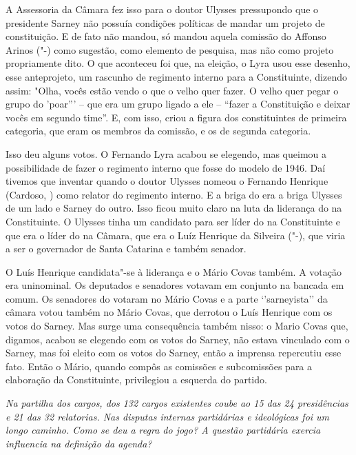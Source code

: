 A Assessoria da Câmara fez isso para o doutor Ulysses pressupondo que o
presidente Sarney não possuía condições políticas de mandar um projeto
de constituição. E de fato não mandou, só mandou aquela comissão do
Affonso Arinos ("-) como sugestão, como elemento de pesquisa, mas
não como projeto propriamente dito. O que aconteceu foi que, na eleição,
o Lyra usou esse desenho, esse anteprojeto, um rascunho de regimento
interno para a Constituinte, dizendo assim: "Olha, vocês estão vendo o
que o velho quer fazer. O velho quer pegar o grupo do 'poar''' -- que
era um grupo ligado a ele -- ``fazer a Constituição e deixar vocês em
segundo time''. E, com isso, criou a figura dos constituintes de
primeira categoria, que eram os membros da comissão, e os de segunda
categoria.

Isso deu alguns votos. O Fernando Lyra acabou se elegendo, mas queimou a
possibilidade de fazer o regimento interno que fosse do modelo de 1946.
Daí tivemos que inventar quando o doutor Ulysses nomeou o Fernando
Henrique (Cardoso, ) como relator do regimento interno. E a briga do
 era a briga Ulysses de um lado e Sarney do outro. Isso ficou muito
claro na luta da liderança do  na Constituinte. O Ulysses tinha um
candidato para ser líder do  na Constituinte e que era o líder do
 na Câmara, que era o Luíz Henrique da Silveira ("-), que viria
a ser o governador de Santa Catarina e também senador.

O Luís Henrique candidata"-se à liderança e o Mário Covas também. A
votação era uninominal. Os deputados e senadores votavam em conjunto na
bancada em comum. Os senadores do  votaram no Mário Covas e a parte
`'sarneyista'' da câmara votou também no Mário Covas, que derrotou o
Luís Henrique com os votos do Sarney. Mas surge uma consequência também
nisso: o Mario Covas que, digamos, acabou se elegendo com os votos do
Sarney, não estava vinculado com o Sarney, mas foi eleito com os votos
do Sarney, então a imprensa repercutiu esse fato. Então o Mário, quando
compôs as comissões e subcomissões para a elaboração da Constituinte,
privilegiou a esquerda do partido.

\medskip

\emph{Na partilha dos cargos, dos 132 cargos existentes coube ao 
15 das 24 presidências e 21 das 32 relatorias. Nas disputas internas
partidárias e ideológicas foi um longo caminho. Como se deu a regra do
jogo? A questão partidária exercia influencia na definição da agenda?}


